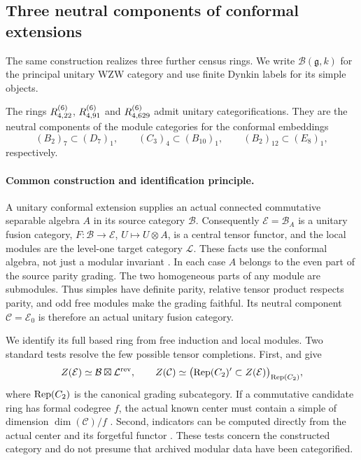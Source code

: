 \subsection{Three neutral components of conformal extensions}
\label{sec:conformal-models}
The same construction realizes three further census rings. We write
$\mathcal B(\mathfrak g,k)$ for the principal unitary WZW category and
use finite Dynkin labels for its simple objects.

\begin{theorem}\label{thm:conformal-models}
The rings $R^{(6)}_{4,22}$, $R^{(6)}_{4,91}$ and $R^{(6)}_{4,629}$ admit unitary
categorifications. They are the neutral components of the module
categories for the conformal embeddings
\[
 (B_2)_7\subset(D_7)_1,\qquad
 (C_3)_4\subset(B_{10})_1,\qquad
 (B_2)_{12}\subset(E_8)_1,
\]
respectively.
\end{theorem}

\paragraph{Common construction and identification principle.}
A unitary conformal extension supplies an actual connected commutative
separable algebra $A$ in its source category $\mathcal B$.
Consequently $\mathcal E=\mathcal B_A$ is a unitary fusion category,
$F:\mathcal B\to\mathcal E$, $U\mapsto U\otimes A$, is a central
 tensor functor, and the local modules are the level-one target category
$\mathcal L$. These facts use the conformal algebra, not just a modular
invariant \cite[Sections~6.1--6.2]{DMNO}.
In each case $A$ belongs to the even part of the source parity grading.
The two homogeneous parts of any module are submodules. Thus simples
have definite parity, relative tensor product respects parity, and odd
free modules make the grading faithful. Its neutral component
$\mathcal C=\mathcal E_0$ is therefore an actual unitary fusion category.

We identify its full based ring from free induction and local modules.
Two standard tests resolve the few possible tensor completions. First,
\cite[Corollary~3.30]{DMNO} and \cite[Proposition~8.23.11]{EGNO} give
\begin{equation}\label{eq:conformal-neutral-center}
 Z(\mathcal E)\simeq\mathcal B\boxtimes\mathcal L^{\rm rev},
 \qquad
 Z(\mathcal C)\simeq
 \bigl(\operatorname{Rep}(C_2)'\subset Z(\mathcal E)\bigr)_{\operatorname{Rep}(C_2)},
\end{equation}
where $\operatorname{Rep}(C_2)$ is the canonical grading subcategory. If a commutative
candidate ring has formal codegree $f$, the actual known center must
contain a simple of dimension $\dim(\mathcal C)/f$
\cite[Theorem~2.13]{Ostrik3}. Second, indicators can be computed directly
from the actual center and its forgetful functor \cite{NS}.
These tests concern the constructed category and do not presume that
archived modular data have been categorified.

